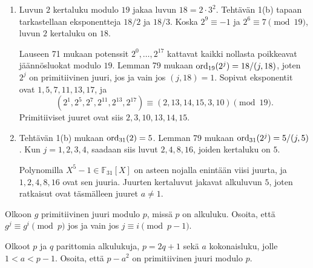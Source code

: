 \documentclass[11pt,a4paper]{amsart}
\begin{document}
\begin{solution}
  \leavevmode\par
  \begin{enumerate}[label=(\alph*), topsep=0.35em]
    \item Luvun \(2\) kertaluku modulo \(19\) jakaa luvun \(18=2\cdot 3^2\).
      Tehtävän 1(b) tapaan tarkastellaan eksponentteja \(18/2\) ja \(18/3\).
      Koska \(2^9\equiv -1\) ja \(2^6\equiv 7\pmod{19}\), luvun \(2\)
      kertaluku on \(18\).

      Lauseen 71 mukaan potenssit \(2^0,\dots,2^{17}\)
      kattavat kaikki nollasta poikkeavat jäännösluokat modulo \(19\).
      Lemman 79 mukaan \(\operatorname{ord}_{19}(2^j)=18/(j,18)\), joten \(2^j\) on
      primitiivinen juuri, jos ja vain jos \((j,18)=1\).
      Sopivat eksponentit ovat \(1,5,7,11,13,17\), ja
      \[
        (2^1,2^5,2^7,2^{11},2^{13},2^{17})
        \equiv (2,13,14,15,3,10)\pmod{19}.
      \]
      Primitiiviset juuret ovat siis \(2,3,10,13,14,15\).

    \item Tehtävän 1(b) mukaan \(\operatorname{ord}_{31}(2)=5\). Lemman 79 mukaan
      \(\operatorname{ord}_{31}(2^j)=5/(j,5)\). Kun \(j=1,2,3,4\), saadaan siis
      luvut \(2,4,8,16\), joiden kertaluku on \(5\).

      Polynomilla \(X^5-1\in\mathbb{F}_{31}[X]\) on asteen nojalla enintään
      viisi juurta, ja \(1,2,4,8,16\) ovat sen juuria. Juurten kertaluvut
      jakavat alkuluvun \(5\), joten ratkaisut ovat täsmälleen juuret
      \(a\ne 1\).
  \end{enumerate}
\end{solution}

\begin{exercise}
  Olkoon \(g\) primitiivinen juuri modulo \(p\), missä \(p\) on alkuluku.
  Osoita, että \(g^j \equiv g^i \pmod{p}\) jos ja vain jos
  \(j \equiv i \pmod{p-1}\).
\end{exercise}

\begin{exercise}
  Olkoot \(p\) ja \(q\) parittomia alkulukuja, \(p = 2q + 1\) sekä \(a\)
  kokonaisluku, jolle \(1 < a < p - 1\). Osoita, että \(p - a^2\) on
  primitiivinen juuri modulo \(p\).
\end{exercise}
\end{document}
